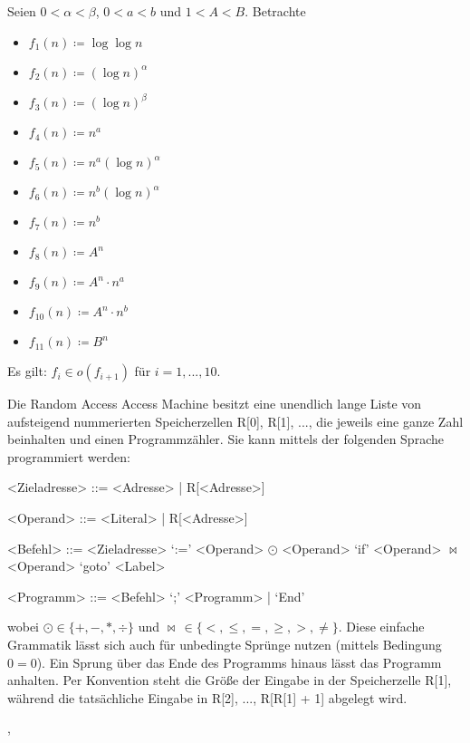\documentclass{cheat-sheet}
\begin{document}
\begin{satz}
  Seien $0 < \alpha < \beta$, $0 < a < b$ und $1 < A < B$. Betrachte
  \begin{multicols}{3}
    \begin{itemize}
      \item $f_1(n) \coloneqq \log \log n$
      \item $f_2(n) \coloneqq (\log n)^\alpha$
      \item $f_3(n) \coloneqq (\log n)^\beta$
      \item $f_4(n) \coloneqq n^a$
      \item $f_5(n) \coloneqq n^a (\log n)^\alpha$
      \item $f_6(n) \coloneqq n^b (\log n)^\alpha$
      \item $f_7(n) \coloneqq n^b$
      \item $f_8(n) \coloneqq A^n$
      \item $f_9(n) \coloneqq A^n \cdot n^a$
      \item $f_{10}(n) \coloneqq A^n \cdot n^b$
      \item $f_{11}(n) \coloneqq B^n$
    \end{itemize}
  \end{multicols}
  Es gilt: $f_i \in o(f_{i+1})$ für $i = 1, ..., 10$.
\end{satz}


\begin{defn}[RAM]
  Die Random Access Access Machine besitzt eine unendlich lange Liste von aufsteigend nummerierten Speicherzellen R[0], R[1], ..., die jeweils eine ganze Zahl beinhalten und einen Programmzähler. Sie kann mittels der folgenden Sprache programmiert werden:
  \begin{grammar}
    <Zieladresse> ::= <Adresse> | R[<Adresse>]

    <Operand> ::= <Literal> | R[<Adresse>]

    <Befehl> ::= <Zieladresse> `:=' <Operand> $\odot$ <Operand>
    \alt `if' <Operand> $\bowtie$ <Operand> `goto' <Label>

    <Programm> ::= <Befehl> `;' <Programm> | `End'
  \end{grammar}
  wobei $\odot \in \{ +, -, *, \div \}$ und $\bowtie \, \in \{ <, \leq, =, \geq, >, \not= \}$. Diese einfache Grammatik lässt sich auch für unbedingte Sprünge nutzen (mittels Bedingung $0 = 0$). Ein Sprung über das Ende des Programms hinaus lässt das Programm anhalten. Per Konvention steht die Größe der Eingabe in der Speicherzelle R[1], während die tatsächliche Eingabe in R[2], ..., R[R[1] + 1] abgelegt wird.
\end{defn},
\end{document}
